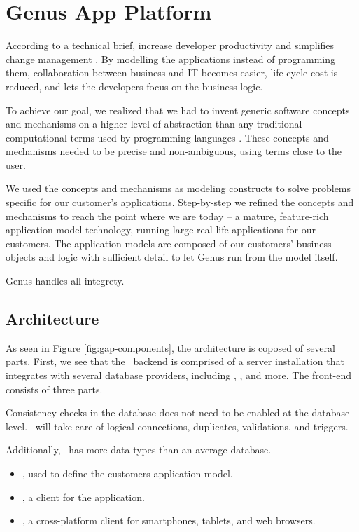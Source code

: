 \chapter{Genus App Platform}
\label{chap:Genus App Platform}
According to a technical brief, \gap increase developer productivity and simplifies change management \cite{tech-brief-gap}. By modelling the applications instead of programming them, collaboration between business and IT becomes easier, life cycle cost is reduced, and lets the developers focus on the business logic.

To achieve our goal, we realized that we had to invent generic software concepts and mechanisms on a higher level of abstraction than any traditional computational terms used by programming languages \cite{noauthor_undated-qy}. These concepts and mechanisms needed to be precise and non-ambiguous, using terms close to the user.
 
We used the concepts and mechanisms as modeling constructs to solve problems specific for our customer’s applications. Step-by-step we refined the concepts and mechanisms to reach the point where we are today – a mature, feature-rich application model technology, running large real life applications for our customers. The application models are composed of our customers' business objects and logic with sufficient detail to let Genus run from the model itself.
 
Genus handles all integrety.

\section{Architecture}
\label{sec:Architecture}
As seen in Figure \ref{fig:gap-components}, the architecture is coposed of several parts. First, we see that the \gap~backend is comprised of a server installation that integrates with several database providers, including , ,  and more. The front-end consists of three parts.

Consistency checks in the database does not need to be enabled at the database level. \gap~will take care of logical connections, duplicates, validations, and triggers.

Additionally, \gap~has more data types than an average database.

\begin{itemize}
    \item {}, used to define the customers application model.
    \item {}, a  client for the application.
    \item {}, a cross-platform client for smartphones, tablets, and web browsers.
\end{itemize}

